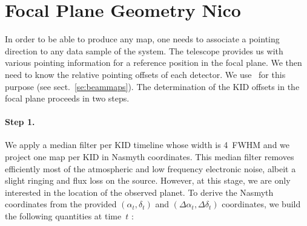 %
%
%

\section{Focal Plane Geometry {\color{YellowGreen} Nico}}
\label{se:fov_geometry}



In order to be able to produce any map, one needs to associate a pointing
direction to any data sample of the system. The telescope provides us with
various pointing information for a reference position in the focal plane. We
then need to know the relative pointing offsets of each detector. We use
\bms\ for this purpose (see sect.~\ref{se:beammaps}). The determination of the
KID offsets in the focal plane proceeds in two steps.

\paragraph{Step 1.} We apply a median filter per
KID timeline whose width is 4~FWHM and we project one map per KID in Nasmyth
coordinates. This median filter removes efficiently most of the atmospheric and low frequency
electronic noise, albeit a slight ringing and flux loss on the
source. However, at this stage, we are only interested in the location of the
observed planet. To derive the Nasmyth coordinates from the provided
$(\alpha_t,\delta_t)$ and $(\Delta\alpha_t,\Delta\delta_t)$
coordinates, we build the following quantities at time~$t$ :

